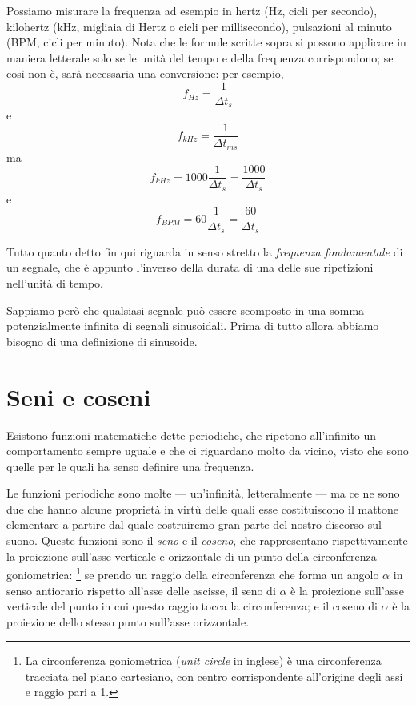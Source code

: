 Possiamo misurare la frequenza ad esempio in hertz (Hz, cicli per secondo), kilohertz (kHz, migliaia di Hertz o cicli per millisecondo), pulsazioni al minuto (BPM, cicli per minuto). Nota che le formule scritte sopra si possono applicare in maniera letterale solo se le unità del tempo e della frequenza corrispondono; se così non è, sarà necessaria una conversione: per esempio,
\begin{equation}
f_{Hz} = \frac{1}{\Delta t_{s}}
\end{equation}
e
\begin{equation}
f_{kHz} = \frac{1}{\Delta t_{ms}}
\end{equation}
ma
\begin{equation}
f_{kHz} = 1000\frac{1}{\Delta t_{s}} = \frac{1000}{\Delta t_{s}}
\end{equation}
e
\begin{equation}
f_{BPM} = 60\frac{1}{\Delta t_{s}} = \frac{60}{\Delta t_{s}}
\end{equation}

Tutto quanto detto fin qui riguarda in senso stretto la \emph{frequenza fondamentale} di un segnale, che è appunto l'inverso della durata di una delle sue ripetizioni nell'unità di tempo.

Sappiamo però che qualsiasi segnale può essere scomposto in una somma potenzialmente infinita di segnali sinusoidali. Prima di tutto allora abbiamo bisogno di una definizione di sinusoide.


\section{Seni e coseni}

Esistono funzioni matematiche dette periodiche, che ripetono all'infinito un comportamento sempre uguale e che ci riguardano molto da vicino, visto che sono quelle per le quali ha senso definire una frequenza.

Le funzioni periodiche sono molte --- un'infinità, letteralmente --- ma ce ne sono due che hanno alcune proprietà in virtù delle quali esse costituiscono il mattone elementare a partire dal quale costruiremo gran parte del nostro discorso sul suono. Queste funzioni sono il \emph{seno} e il \emph{coseno}, che rappresentano rispettivamente la proiezione sull'asse verticale e orizzontale di un punto della circonferenza goniometrica:%
\footnote{La circonferenza goniometrica (\emph{unit circle} in inglese) è una circonferenza tracciata nel piano cartesiano, con centro corrispondente all'origine degli assi e raggio pari a 1.}
se prendo un raggio della circonferenza che forma un angolo $\alpha$ in senso antiorario rispetto all'asse delle ascisse, il seno di $\alpha$ è la proiezione sull'asse verticale del punto in cui questo raggio tocca la circonferenza; e il coseno di $\alpha$ è la proiezione dello stesso punto sull'asse orizzontale.

